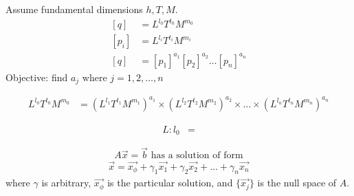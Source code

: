 \documentclass[
	date={August 26{,} 2024}
]{math486notes}
\begin{document}
Assume fundamental dimensions $h, T, M$.
\begin{equation*}
\begin{aligned}
	[q] &= L^{l_{0}}T^{t_{0}}M^{m_{0}}\\
	[p_{i}] &= L^{l_{i}}T^{t_{i}}M^{m_{i}}\\
	[q] &= [p_{1}]^{a_{1}}[p_{2}]^{a_{2}}\dots[p_{n}]^{a_{n}}
\end{aligned}
\end{equation*}
Objective: find $a_{j}$ where $j=1,2,\dots,n$

\begin{equation*}
\begin{aligned}
	L^{l_{0}}T^{t_{0}}M^{m_{0}} &= \left( L^{l_{1}}T^{t_{1}}M^{m_{1}} \right)^{a_{1}}\times\left( L^{l_{2}}T^{t_{2}}M^{m_{2}} \right)^{a_{2}}\times\dots\times\left( L^{l_{n}}T^{t_{n}}M^{m_{n}} \right)^{a_{n}}
\end{aligned}
\end{equation*}

\begin{equation*}
\begin{aligned}
	L: l_{0} &=
\end{aligned}
\end{equation*}

\[ A\vec{x} = \vec{b} \mbox{ has a solution of form}\]
\begin{equation*}
\begin{aligned}
	\vec{x} = \vec{x_{\phi}} + \gamma_{1}\vec{x_{1}} + \gamma_{2}\vec{x_{2}} + \dots + \gamma_{n}\vec{x_{n}}
\end{aligned}
\end{equation*}
where $\gamma$ is arbitrary, $\vec{x_{\phi}}$ is the particular solution, and $\{ \vec{x_{j}} \}$ is the null space of $A$.
\end{document}
